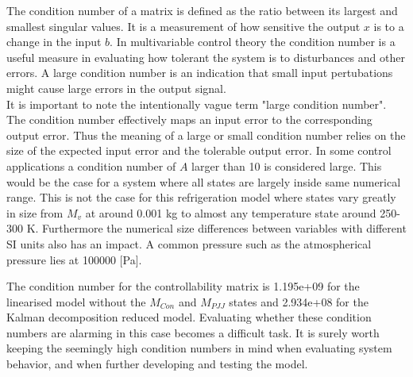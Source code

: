 The condition number of a matrix is defined as the ratio between its largest and smallest singular values. It is a measurement of how sensitive the output $x$ is to a change in the input $b$. In multivariable control theory the condition number is a useful measure in evaluating how tolerant the system is to disturbances and other errors. A large condition number is an indication that small input pertubations might cause large errors in the output signal.\\

It is important to note the intentionally vague term "large condition number". The condition number effectively maps an input error to the corresponding output error. Thus the meaning of a large or small condition number relies on the size of the expected input error and the tolerable output error. In some control applications a condition number of $A$ larger than 10 is considered large. This would be the case for a system where all states are largely inside same numerical range. This is not the case for this refrigeration model where states vary greatly in size from $M_v$ at around 0.001 \si{kg} to almost any temperature state around 250-300 \si{K}. Furthermore the numerical size differences between variables with different SI units also has an impact. A common pressure such as the atmospherical pressure lies at 100000 [Pa].

The condition number for the controllability matrix is 1.195e+09 for the linearised model without the $M_{Con}$ and $M_{PJJ}$ states and 2.934e+08 for the Kalman decomposition reduced model. Evaluating whether these condition numbers are alarming in this case becomes a difficult task. It is surely worth keeping the seemingly high condition numbers in mind when evaluating system behavior, and when further developing and testing the model.


